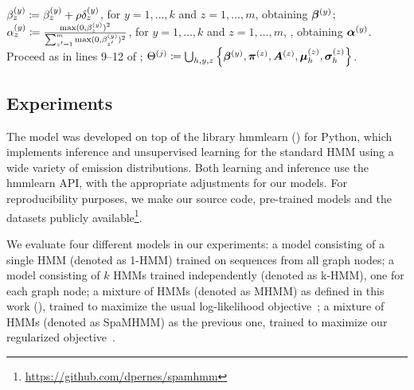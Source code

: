 \begin{algorithm}
\begin{algorithmic}[1]
        \vspace{0.3cm}
        \State ${\beta}^{(y)}_{z} \coloneqq {\beta}^{(y)}_{z} + \rho \delta^{(y)}_z$, for $y=1,\dots,k$ and $z=1,\dots,m$, obtaining ${\bm{\beta}}^{(y)}$;
        \vspace{0.3cm}
        \State ${\alpha}^{(y)}_{z} \coloneqq \frac{\max(0, {\beta^{(y)}_z})^2}{\sum_{z'=1}^m \max(0, {\beta^{(y)}_{z'}})^2}$, for $y=1,\dots,k$ and $z=1,\dots,m$, , obtaining ${\bm{\alpha}}^{(y)}$.
        \vspace{0.3cm}
        \EndFor
        \vspace{0.3cm}
        \State Proceed as in lines 9--12 of ;
        \vspace{0.3cm}
        \State $\Theta^{(j)} \coloneqq \bigcup_{h,y,z} \left\lbrace {\bm{\beta}}^{(y)}, {\bm{\pi}}^{(z)}, {\bm{A}}^{(z)}, {\bm{\mu}}^{(z)}_h, {\bm{\sigma}}^{(z)}_h \right\rbrace$.
        \vspace{0.3cm}
        \EndIndent
        \EndFor
    \end{algorithmic}
\end{algorithm}

\subsection{Experiments}
\label{sec:spamhmm_experiments}
The model was developed on top of the library hmmlearn (\citet{hmmlearn}) for Python, which implements inference and unsupervised learning for the standard HMM using a wide variety of emission distributions. Both learning and inference use the hmmlearn API, with the appropriate adjustments for our models. For reproducibility purposes, we make our source code, pre-trained models and the datasets publicly available\footnote{\url{https://github.com/dpernes/spamhmm}}.

We evaluate four different models in our experiments: a model consisting of a single HMM (denoted as 1-HMM) trained on sequences from all graph nodes; a model consisting of $k$ HMMs trained independently (denoted as k-HMM), one for each graph node; a mixture of HMMs (denoted as MHMM) as defined in this work (), trained to maximize the usual log-likelihood objective~; a mixture of HMMs (denoted as SpaMHMM) as the previous one, trained to maximize our regularized objective~.

